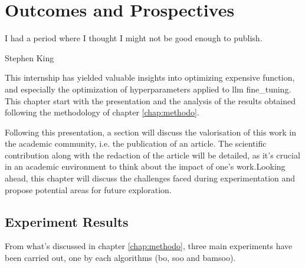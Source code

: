 \chapter{Outcomes and Prospectives}
\label{chap:outcomes}

\epigraph{I had a period where I thought I might not be good enough to publish.}{Stephen King}

This internship has yielded valuable insights into optimizing expensive function, and especially the optimization of hyperparameters applied to \acrshort{llm} \gls{fine_tuning}. This chapter start with the presentation and the analysis of the results obtained following the methodology of chapter \ref{chap:methodo}.

Following this presentation, a section will discuss the valorisation of this work in the academic community, i.e. the publication of an article. The scientific contribution along with the redaction of the article will be detailed, as it's crucial in an academic environment to think about the impact of one's work.Looking ahead, this chapter will discuss the challenges faced during experimentation and propose potential areas for future exploration. 



\section{Experiment Results}
\label{sec:exp_results}
From what's discussed in chapter \ref{chap:methodo}, three main experiments have been carried out, one by each algorithms (\acrshort{bo}, \acrshort{soo} and \acrshort{bamsoo}). 

